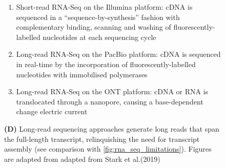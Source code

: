 \begin{figure}[htp]
{\begin{enumerate}[label=\textbf{(\Alph*)}]
			\item Short-read RNA-Seq on the Illumina platform: cDNA is sequenced in a “sequence-by-synthesis” fashion with complementary binding, scanning and washing of fluorescently-labelled nucleotides at each sequencing cycle
			\item Long-read RNA-Seq on the PacBio platform: cDNA is sequenced in real-time by the incorporation of fluorescently-labelled nucleotides with immobilised polymerases
			\item Long-read RNA-Seq on the ONT platform: cDNA or RNA is translocated through a nanopore, causing a base-dependent change electric current
			\\
		\end{enumerate}
		\textbf{(D)} Long-read sequencing approaches generate long reads that span the full-length transcript, relinquishing the need for transcript assembly (see comparison with \cref{fig:rna_seq_limitations}). \newline
		Figures are adapted from adapted from Stark et al.(2019) \cite{Stark2019}
	} 
	\label{fig:longread_benefits}
\end{figure}	


